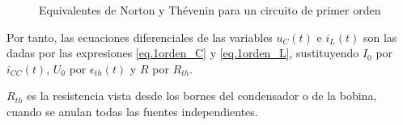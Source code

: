 	\begin{figure}[H]
	    \centering
	    \hfil
	    \caption{Equivalentes de Norton y Thévenin para un circuito de primer orden}
	    \label{fig.thevenin_1orden}
	\end{figure}
	Por tanto, las ecuaciones diferenciales de las variables $u_C(t)$ e $i_L(t)$ son las dadas por las expresiones \eqref{eq.1orden_C} y \eqref{eq.1orden_L}, sustituyendo $I_0$ por $i_{CC}(t)$, $U_0$ por $\epsilon_{th}(t)$ y $R$ por $R_{th}$.
	
	\begin{remark}
	    $R_{th}$ es la resistencia vista desde los bornes del condensador o de la bobina, cuando se anulan todas las fuentes independientes.
	\end{remark}
	
